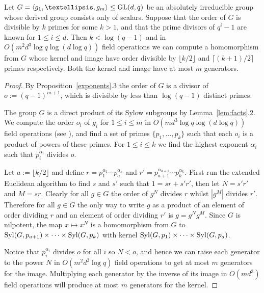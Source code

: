 \begin{Lemm} 
Let $G = \langle g_1, \ldots, g_m \rangle \leq \GL(d, q)$ 
be an absolutely irreducible group whose derived group 
consists only of scalars. Suppose that the order of $G$ 
is divisible by $k$ primes for some $k > 1$, and that 
the prime divisors of $q^i-1$ are known for $1 \leq i \leq d$. 
Then $k < \log (q-1)$ and in  $O(m^2 d^3 \log q \log( d \log q))$ 
field operations we can compute a homomorphism from $G$ 
whose kernel and image have order divisible by $\lfloor k/2 \rfloor$ 
and $\lceil (k+1)/2 \rceil$ primes respectively. Both 
the kernel and image have at most $m$ generators. 
\end{Lemm}

\begin{proof}
By Proposition~\ref{exponents}.3 the order of $G$ is a 
divisor of $o:= (q-1)^{m+1}$, which is divisible by 
less than $\log (q-1)$ distinct primes. 

The group $G$ is a direct product of its Sylow subgroups 
by Lemma~\ref{lem:facts}.2. We compute the order $o_i$ of 
$g_i$ for $1 \leq i \leq m$ in $O(m d^3 \log q \log (d \log q))$ 
field operations (see \cite{cellarlg}), and find a set of 
primes $\{p_1, \ldots, p_k\}$ such that each $o_i$ is 
a product of powers of these primes. 
For $1 \leq i \leq k$ we find the highest exponent $\alpha_i$ 
such that $p_i^{\alpha_i}$ divides $o$. %

Let $a:= \lfloor k/2 \rfloor$ and define $r = p_1^{\alpha_1} \cdots
p_a^{\alpha_a}$ and $r' = p_{a+1}^{\alpha_{a+1}} \cdots p_k^{\alpha_k}$.
First run the extended Euclidean algorithm to find $s$ and $s'$ such
that $1 = sr + s'r'$, then let $N = s'r'$ and $M = sr$. Clearly for all
$g \in G$ the order of $g^N$ divides $r$ whilst $|g^M|$ divides $r'$.
Therefore for all $g \in G$ the only way to write $g$ as a product of
an element of order dividing $r$ and an element of order dividing $r'$
is $g = g^N g^M$. Since $G$ is nilpotent, the map $x \mapsto x^N$ is a
homomorphism from $G$ to $\Syl(G, p_{a+1}) \times \cdots \times \Syl(G,
p_k)$ with kernel $\Syl(G, p_1) \times \cdots \times \Syl(G, p_{a})$.

Notice that $p_i^{\alpha_i}$ divides $o$ for 
all $i$  so  $N < o$, and hence we can raise each 
generator to the power $N$ in $O(m^2 d^3 \log q)$ field 
operations to get at most $m$ generators for the image. 
Multiplying each generator by the inverse of its image 
in $O(m d^3)$ field operations will produce at most $m$ 
generators for the kernel.
\end{proof}



